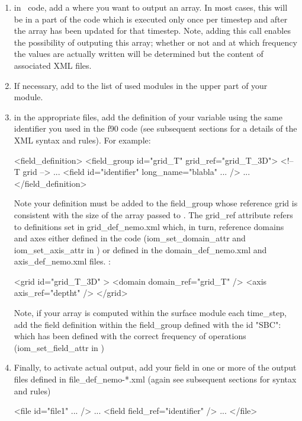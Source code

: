 \documentclass[../main/NEMO_manual]{subfiles}
\begin{document}
\begin{enumerate}
\item in \NEMO\ code, add a  where you want
to output an array. In most cases, this will be in a part of the code which is executed
only once per timestep and after the array has been updated for that timestep. Note,
adding this call enables the possibility of outputing this array; whether or not and at
which frequency the values are actually written will be determined but the content of
associated XML files.
\item If necessary, add  to the list of used
modules in the upper part of your module.
\item in the appropriate  files, add the
definition of your variable using the same identifier you used in the f90 code (see
subsequent sections for a details of the XML syntax and rules).  For example:
\begin{xmllines}
   <field_definition>
         <field_group id="grid_T" grid_ref="grid_T_3D"> <!-- T grid -->
         ...
                  <field id="identifier" long_name="blabla" ... />
                  ...
   </field_definition>
\end{xmllines}
Note your definition must be added to the field\_group whose reference grid is consistent
with the size of the array passed to . The grid\_ref attribute refers to
definitions set in grid\_def\_nemo.xml which, in turn, reference domains and axes either
defined in the code (iom\_set\_domain\_attr and iom\_set\_axis\_attr in ) or
defined in the domain\_def\_nemo.xml and axis\_def\_nemo.xml files.  \eg:
\begin{xmllines}
  <grid id="grid_T_3D" >
    <domain domain_ref="grid_T" />
    <axis axis_ref="deptht" />
  </grid>
\end{xmllines}
Note, if your array is computed within the surface module each 
time\_step, add the field definition within the field\_group defined with the id "SBC":
 which has been defined with the correct frequency of
operations (iom\_set\_field\_attr in ) \item Finally, to activate actual output,
add your field in one or more of the output files defined in file\_def\_nemo-*.xml (again
see subsequent sections for syntax and rules)
\begin{xmllines}
<file id="file1" ... />
...
   <field field_ref="identifier" />
   ...
</file>
\end{xmllines}
\end{enumerate}
\end{document}
